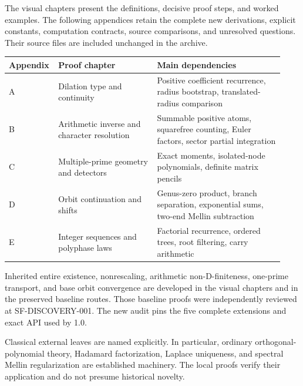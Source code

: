The visual chapters present the definitions, decisive proof steps, and worked
examples. The following appendices retain the complete new derivations,
explicit constants, computation contracts, source comparisons, and unresolved
questions. Their source files are included unchanged in the archive.

\begin{tabular}{@{}p{0.13\linewidth}p{0.35\linewidth}p{0.45\linewidth}@{}}
\toprule
Appendix & Proof chapter & Main dependencies\\\midrule
A & Dilation type and continuity & Positive coefficient recurrence, radius bootstrap, translated-radius comparison\\
B & Arithmetic inverse and character resolution & Summable positive atoms, squarefree counting, Euler factors, sector partial integration\\
C & Multiple-prime geometry and detectors & Exact moments, isolated-node polynomials, definite matrix pencils\\
D & Orbit continuation and shifts & Genus-zero product, branch separation, exponential sums, two-end Mellin subtraction\\
E & Integer sequences and polyphase laws & Factorial recurrence, ordered trees, root filtering, carry arithmetic\\
\bottomrule\end{tabular}

Inherited entire existence, nonrescaling, arithmetic non-D-finiteness,
one-prime transport, and base orbit convergence are developed in the visual
chapters and in the preserved baseline routes. Those baseline proofs were
independently reviewed at SF-DISCOVERY-001. The new audit pins the five
complete extensions and exact API used by 1.0.

Classical external leaves are named explicitly. In particular, ordinary
orthogonal-polynomial theory, Hadamard factorization, Laplace uniqueness,
and spectral Mellin regularization are established machinery. The local
proofs verify their application and do not presume historical novelty.

\clearpage\appendix

\clearpage
\clearpage
\clearpage
\clearpage\begingroup\setlength{\parskip}{3pt}\endgroup

